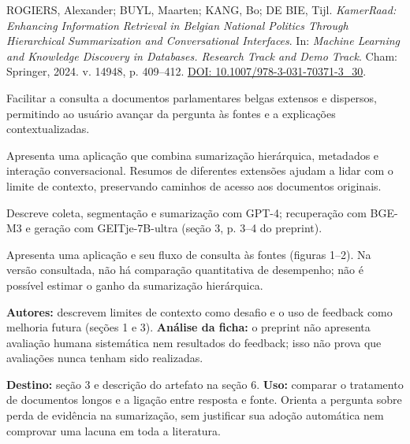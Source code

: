 {\small ROGIERS, Alexander; BUYL, Maarten; KANG, Bo; DE BIE, Tijl.
\textit{KamerRaad: Enhancing Information Retrieval in Belgian National Politics Through Hierarchical Summarization and Conversational Interfaces}.
In: \textit{Machine Learning and Knowledge Discovery in Databases. Research Track and Demo Track}. Cham: Springer, 2024. v. 14948, p. 409--412.
\href{https://doi.org/10.1007/978-3-031-70371-3_30}{DOI: 10.1007/978-3-031-70371-3\_30}.\par}

Facilitar a consulta a documentos parlamentares belgas extensos e dispersos, permitindo ao usuário avançar da pergunta às fontes e a explicações contextualizadas.

Apresenta uma aplicação que combina sumarização hierárquica, metadados e interação conversacional. Resumos de diferentes extensões ajudam a lidar com o limite de contexto, preservando caminhos de acesso aos documentos originais.

Descreve coleta, segmentação e sumarização com GPT-4; recuperação com BGE-M3 e geração com GEITje-7B-ultra (seção 3, p. 3--4 do preprint).

Apresenta uma aplicação e seu fluxo de consulta às fontes (figuras 1--2). Na versão consultada, não há comparação quantitativa de desempenho; não é possível estimar o ganho da sumarização hierárquica.

\begin{itemize}
\end{itemize}

\textbf{Autores:} descrevem limites de contexto como desafio e o uso de feedback como melhoria futura (seções 1 e 3).
\textbf{Análise da ficha:} o preprint não apresenta avaliação humana sistemática nem resultados do feedback; isso não prova que avaliações nunca tenham sido realizadas.

\textbf{Destino:} seção 3 e descrição do artefato na seção 6.
\textbf{Uso:} comparar o tratamento de documentos longos e a ligação entre resposta e fonte. Orienta a pergunta sobre perda de evidência na sumarização, sem justificar sua adoção automática nem comprovar uma lacuna em toda a literatura.

